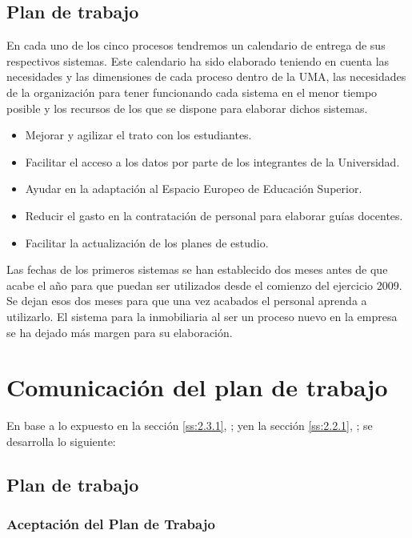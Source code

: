 \documentclass[11pt,a4paper,spanish,twoside]{book}
\begin{document}
\subsection{Plan de trabajo} \label{ss:2.3.1}
En cada uno de los cinco procesos tendremos un calendario de entrega de sus
respectivos sistemas. Este calendario ha sido elaborado teniendo en cuenta
las necesidades y las dimensiones de cada proceso dentro de la UMA, las
necesidades de la organización para tener funcionando cada sistema en el menor
tiempo posible y los recursos de los que se dispone para elaborar dichos
sistemas. 

\begin{itemize}
  \item Mejorar y agilizar el trato con los estudiantes.
  \item Facilitar el acceso a los datos por parte de los integrantes de la 
    Universidad.
  \item Ayudar en la adaptación al Espacio Europeo de Educación Superior.
  \item Reducir el gasto en la contratación de personal para elaborar guías 
    docentes.
  \item Facilitar la actualización de los planes de estudio.
\end{itemize}

Las fechas de los primeros sistemas se han establecido dos meses antes de que
acabe el año para que puedan ser utilizados desde el comienzo del ejercicio
2009. Se dejan esos dos meses para que una vez acabados el personal aprenda a
utilizarlo. El sistema para la inmobiliaria al ser un proceso nuevo en la
empresa se ha dejado más margen para su elaboración. 

\section{Comunicación del plan de trabajo}
En base a lo expuesto en la sección \vref{ss:2.3.1},
\emph{}; yen la sección \vref{ss:2.2.1},
\emph{}; se desarrolla lo siguiente:

\subsection{Plan de trabajo}
\subsubsection{Aceptación del Plan de Trabajo}
\end{document}
